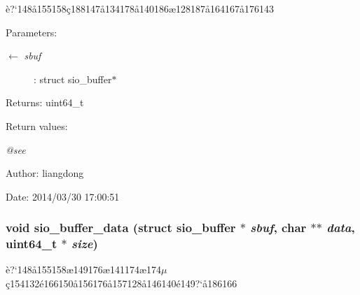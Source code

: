 \`{e}?`148\aa{}155158\c{c}188147\aa{}134178\aa{}140186\ae{}128187\aa{}164167\aa{}176143 

\begin{Desc}
\item[Parameters:]
\begin{description}
\item[\mbox{$\leftarrow$} {\em sbuf}]: struct sio\_\-buffer$\ast$ \end{description}
\end{Desc}
\begin{Desc}
\item[Returns:]uint64\_\-t \end{Desc}
\begin{Desc}
\item[Return values:]
\begin{description}
\item[{\em @see}]\end{description}
\end{Desc}
\begin{Desc}
\item[Author:]liangdong \end{Desc}
\begin{Desc}
\item[Date:]2014/03/30 17:00:51 \end{Desc}
\subsubsection{\setlength{\rightskip}{0pt plus 5cm}void sio\_\-buffer\_\-data (struct sio\_\-buffer $\ast$ {\em sbuf}, char $\ast$$\ast$ {\em data}, uint64\_\-t $\ast$ {\em size})}\label{sio__buffer_8h_a9}


\`{e}?`148\aa{}155158\ae{}149176\ae{}141174\ae{}174$\mu$\c{c}154132\'{e}166150\aa{}156176\aa{}157128\aa{}146140\'{e}149?`\aa{}186166 

